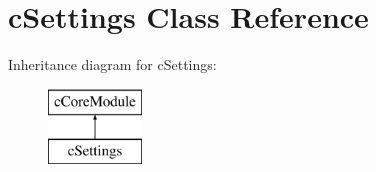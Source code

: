 \hypertarget{classcSettings}{\section{c\-Settings \-Class \-Reference}
\label{d0/d75/classcSettings}
}
\-Inheritance diagram for c\-Settings\-:\begin{figure}[H]
\begin{center}
\leavevmode
\includegraphics[height=2.000000cm]{d0/d75/classcSettings}
\end{center}
\end{figure}
